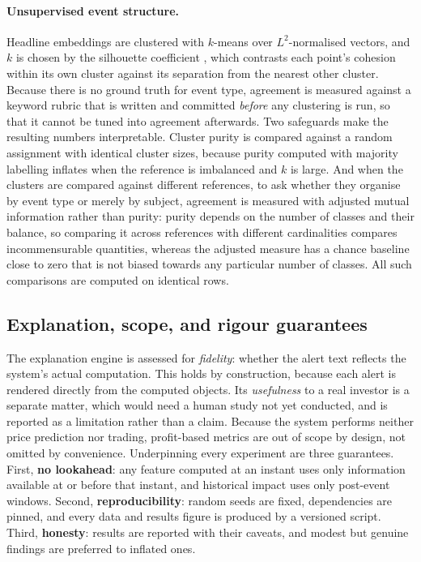 \paragraph{Unsupervised event structure.} Headline embeddings are clustered with $k$-means over
$L^2$-normalised vectors, and $k$ is chosen by the silhouette coefficient
\autocite{rousseeuw1987silhouettes}, which contrasts each point's cohesion within its own cluster
against its separation from the nearest other cluster. Because there is no ground truth for event
type, agreement is measured against a keyword rubric that is written and committed \emph{before} any
clustering is run, so that it cannot be tuned into agreement afterwards. Two safeguards make the
resulting numbers interpretable. Cluster purity is compared against a random assignment with
identical cluster sizes, because purity computed with majority labelling inflates when the reference
is imbalanced and $k$ is large. And when the clusters are compared against different references, to
ask whether they organise by event type or merely by subject, agreement is measured with adjusted
mutual information \autocite{vinh2010ami} rather than purity: purity depends on the number of classes
and their balance, so comparing it across references with different cardinalities compares
incommensurable quantities, whereas the adjusted measure has a chance baseline close to zero that is
not biased towards any particular number of classes.
All such comparisons are computed on identical rows.

\subsection{Explanation, scope, and rigour guarantees}
\label{sec:met_eval_rigour}

The explanation engine is assessed for \emph{fidelity}: whether the alert text reflects the system's
actual computation. This holds by construction, because each alert is rendered directly from the computed
objects. Its \emph{usefulness} to a real investor is a separate matter, which would need a human study not
yet conducted, and is reported as a limitation rather than a claim. Because the system performs neither
price prediction nor trading, profit-based metrics are out of scope by design, not omitted by convenience.
Underpinning every experiment are three guarantees. First, \textbf{no lookahead}: any feature computed at
an instant uses only information available at or before that instant, and historical impact uses only
post-event windows. Second, \textbf{reproducibility}: random seeds are fixed, dependencies are pinned, and
every data and results figure is produced by a versioned script. Third, \textbf{honesty}: results are
reported with their caveats, and modest but genuine findings are preferred to inflated ones.

